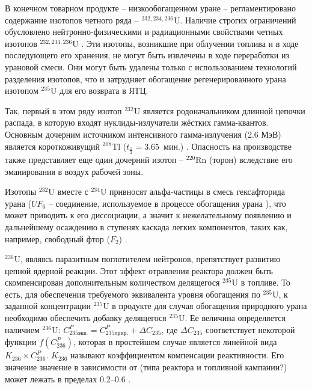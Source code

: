 В конечном товарном продукте -- низкообогащенном уране -- регламентировано содержание изотопов четного ряда -- $^{232,234,236}$U.
Наличие строгих ограничений обусловлено нейтронно-физическими и радиационными свойствами четных изотопов $^{232,234,236}$U \cite{smirnovEvolutionIsotopicComposition2012, proselkovAnalizVozmozhnostiIspolzovaniya2003, dudnikovInfluence236UEfficacy2016}.
Эти изотопы, возникшие при облучении топлива и в ходе последующего его хранения, не могут быть извлечены в ходе переработки из урановой смеси. Они могут быть удалены только с использованием технологий разделения изотопов, что и затрудняет обогащение регенерированного урана изотопом $^{235}$U для его возврата в ЯТЦ.

Так, первый в этом ряду изотоп $^{232}$U является родоначальником длинной цепочки распада, в которую входят нуклиды-излучатели жёстких гамма-квантов.
Основным дочерним источником интенсивного гамма-излучения (2.6 МэВ) является короткоживущий $^{208}$Tl ($t_{\frac{1}{2}}=3.65$ мин.) \cite{matveevUran232EgoVliyanie1985,abbasProliferationResistanceFeatures2013}. Опасность на производстве также представляет еще один дочерний изотоп -- $^{220}$Rn (торон) вследствие его эманирования в воздух рабочей зоны.

Изотопы $^{232}$U вместе с $^{234}$U привносят альфа-частицы в смесь гексафторида урана ($UF_6$ -- соединение, используемое в процессе обогащения урана \cite{orlovWayObtainUranium2015, orlovDesublimationPurificationTransporting2017}), что может приводить к его диссоциации, а значит к нежелательному появлению и дальнейшему осаждению в ступенях каскада легких компонентов, таких как, например, свободный фтор ($F_2$) \cite{kryuchkovObogashchennyyUranDobavleniem2007, bernhardtRadiationEffectsAlpha1958, shmelevRazrabotkaRaschetnoyModeli2012}.

$^{236}$U, являясь паразитным поглотителем нейтронов, препятствует развитию цепной ядерной реакции.
Этот эффект отравления реактора должен быть скомпенсирован дополнительным количеством делящегося $^{235}$U в топливе.
То есть, для обеспечения требуемого эквивалента уровня обогащения по $^{235}$U, к заданной концентрации $^{235}$U в продукте для случая обогащения природного урана необходимо обеспечить добавку делящегося $^{235}$U.
Ее величина определяется наличием $^{236}$U:
$C_{235 экв.}^{P}=C_{235 прир.}^{P}+\Delta C_{235}$, где $\Delta C_{235}$ соответствует некоторой функции $f\left(C_{236}^{P}\right)$, которая в простейшем случае является линейной вида $K_{236} \times C_{236}^{P}$. $K_{236}$ называют коэффициентом компенсации реактивности. Его значение значение в зависимости от (типа реактора и топливной кампании?) может лежать в пределах 0.2--0.6 \cite{delagarzaMulticomponentIsotopeSeparation1961, delculAnalysisReuseUranium2009}. 

